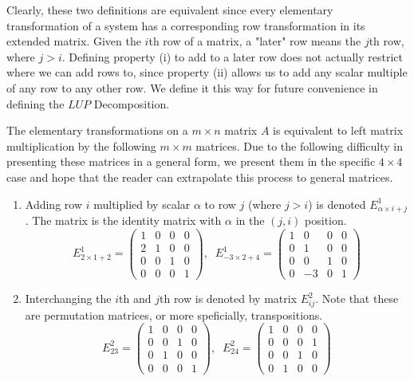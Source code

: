   Clearly, these two definitions are equivalent since every elementary transformation of a system has a corresponding row transformation in its extended matrix. Given the $i$th row of a matrix, a "later" row means the $j$th row, where $j > i$. Defining property (i) to add to a later row does not actually restrict where we can add rows to, since property (ii) allows us to add any scalar multiple of any row to any other row. We define it this way for future convenience in defining the $L U P$ Decomposition. 

  \begin{definition}
    The elementary transformations on a $m \times n$ matrix $A$ is equivalent to left matrix multiplication by the following $m \times m$ matrices. Due to the following difficulty in presenting these matrices in a general form, we present them in the specific $4 \times 4$ case and hope that the reader can extrapolate this process to general matrices. 
    \begin{enumerate}
      \item Adding row $i$ multiplied by scalar $\alpha$ to row $j$ (where $j > i$) is denoted $E^1_{\alpha \times i + j}$. The matrix is the identity matrix with $\alpha$ in the $(j, i)$ position. 
      \begin{equation}
        E^1_{2 \times 1 + 2} = \begin{pmatrix}
        1&0&0&0 \\ 2&1&0&0 \\ 0&0&1&0 \\ 0&0&0&1
        \end{pmatrix}, \;\; E^1_{-3 \times 2 + 4} = \begin{pmatrix}
        1&0&0&0 \\ 0&1&0&0 \\ 0&0&1&0 \\ 0&-3&0&1
        \end{pmatrix}
      \end{equation}
      \item Interchanging the $i$th and $j$th row is denoted by matrix $E^2_{i j}$. Note that these are permutation matrices, or more speficially, transpositions. 
      \begin{equation}
        E^2_{2 3} = \begin{pmatrix}
        1&0&0&0 \\ 0&0&1&0 \\ 0&1&0&0 \\ 0&0&0&1
        \end{pmatrix}, \; \; E^2_{2 4} = \begin{pmatrix}
        1&0&0&0 \\ 0&0&0&1 \\ 0&0&1&0 \\ 0&1&0&0
        \end{pmatrix}
      \end{equation}


\end{enumerate}
\end{definition}
